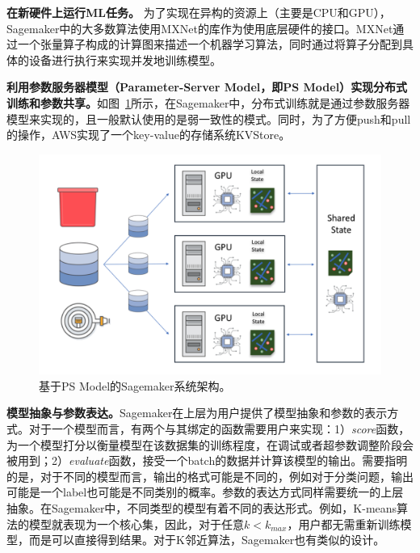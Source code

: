 \textbf{在新硬件上运行ML任务。}
为了实现在异构的资源上（主要是CPU和GPU），Sagemaker中的大多数算法使用MXNet\parencite{chen2015mxnet}的库作为使用底层硬件的接口。MXNet通过一个张量算子构成的计算图来描述一个机器学习算法，同时通过将算子分配到具体的设备进行执行来实现并发地训练模型。

\textbf{利用参数服务器模型（Parameter-Server Model，即PS Model）\parencite{186214}实现分布式训练和参数共享。}如图~\ref{sagemaker_ps}所示，在Sagemaker中，分布式训练就是通过参数服务器模型来实现的，且一般默认使用的是弱一致性的模式。同时，为了方便push和pull的操作，AWS实现了一个key-value的存储系统KVStore。

\begin{figure}[h]
    \centerline{\includegraphics[width=\textwidth]{figures/sagemaker-ps.png}}
    \caption{基于PS Model的Sagemaker系统架构。}
    \label{sagemaker_ps}
\end{figure}

\textbf{模型抽象与参数表达。}Sagemaker在上层为用户提供了模型抽象和参数的表示方式。对于一个模型而言，有两个与其绑定的函数需要用户来实现：1）\textit{score}函数，为一个模型打分以衡量模型在该数据集的训练程度，在调试或者超参数调整阶段会被用到；2）\textit{evaluate}函数，接受一个batch的数据并计算该模型的输出。需要指明的是，对于不同的模型而言，输出的格式可能是不同的，例如对于分类问题，输出可能是一个label也可能是不同类别的概率。参数的表达方式同样需要统一的上层抽象。在Sagemaker中，不同类型的模型有着不同的表达形式。例如，K-means算法的模型就表现为一个核心集，因此，对于任意$k<k_{max}$，用户都无需重新训练模型，而是可以直接得到结果。对于K邻近算法，Sagemaker也有类似的设计。

